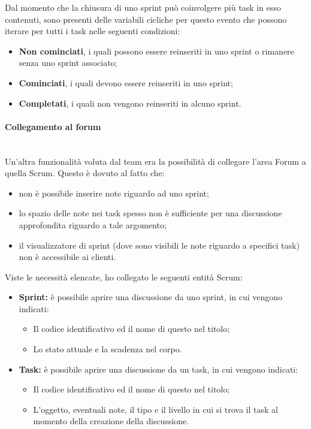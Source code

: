 Dal momento che la chiusura di uno sprint può coinvolgere più task in esso
contenuti, sono presenti delle variabili cicliche per questo evento che
possono iterare per tutti i task nelle seguenti condizioni:

\begin{itemize}
\item \textbf{Non cominciati}, i quali possono essere reinseriti in uno sprint
  o rimanere senza uno sprint associato;
\item \textbf{Cominciati}, i quali devono essere reinseriti in uno sprint;
\item \textbf{Completati}, i quali non vengono reinseriti in alcuno sprint.
\end{itemize}

\paragraph{Collegamento al forum} \mbox{} \\

Un'altra funzionalità voluta dal team era la possibilità di collegare l'area
Forum a quella Scrum. Questo è dovuto al fatto che:

\begin{itemize}
\item non è possibile inserire note riguardo ad uno sprint;
\item lo spazio delle note nei task spesso non è sufficiente per una
  discussione approfondita riguardo a tale argomento;
\item il visualizzatore di sprint (dove sono visibili le note riguardo a
  specifici task) non è accessibile ai clienti.
\end{itemize}

Viste le necessità elencate, ho collegato le seguenti entità Scrum:

\begin{itemize}
\item \textbf{Sprint:} è possibile aprire una discussione da uno sprint, in
  cui vengono indicati:
  \begin{itemize}
  \item Il codice identificativo ed il nome di questo nel titolo;
  \item Lo stato attuale e la scadenza nel corpo.
  \end{itemize}
\item \textbf{Task:} è possibile aprire una discussione da un task, in
  cui vengono indicati:
  \begin{itemize}
  \item Il codice identificativo ed il nome di questo nel titolo;
  \item L'oggetto, eventuali note, il tipo e il livello in cui si trova il
    task al momento della creazione della discussione.
  \end{itemize}
\end{itemize}

